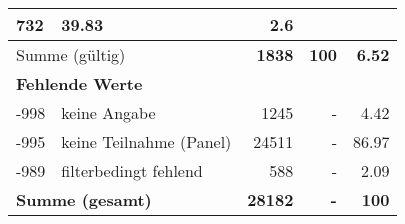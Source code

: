 \begin{longtable}{lXrrr}
       \num{732} &
       \num[round-mode=places,round-precision=2]{39,83} &
         \num[round-mode=places,round-precision=2]{2,6} \\
     \midrule
     \multicolumn{2}{l}{Summe (gültig)} &
       \textbf{\num{1838}} &
     \textbf{100} &
       \textbf{\num[round-mode=places,round-precision=2]{6,52}} \\
     \multicolumn{5}{l}{\textbf{Fehlende Werte}}\\
       -998 &
       keine Angabe &
         \num{1245} &
        - &
         \num[round-mode=places,round-precision=2]{4,42} \\
       -995 &
       keine Teilnahme (Panel) &
         \num{24511} &
        - &
         \num[round-mode=places,round-precision=2]{86,97} \\
       -989 &
       filterbedingt fehlend &
         \num{588} &
        - &
         \num[round-mode=places,round-precision=2]{2,09} \\
     \midrule
     \multicolumn{2}{l}{\textbf{Summe (gesamt)}} &
          \textbf{\num{28182}} &
        \textbf{-} &
        \textbf{100} \\
     \bottomrule
     \end{longtable}
     
